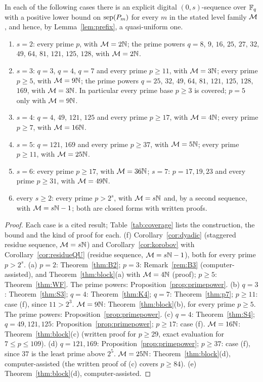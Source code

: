 \begin{theorem}[Coverage]\label{thm:coverage}
In each of the following cases there is an explicit digital $(0,s)$-sequence over $\mathbb{F}_q$ with a positive lower bound on $\operatorname{sep}(P_m)$ for every $m$ in the stated level family $\mathcal{M}$, and hence, by Lemma~\ref{lem:prefix}, a quasi-uniform one.
\begin{enumerate}
\item[(a)] $s=2$: every prime $p$, with $\mathcal{M}=2\mathbb{N}$; the prime powers $q=8$, $9$, $16$, $25$, $27$, $32$, $49$, $64$, $81$, $121$, $125$, $128$, with $\mathcal{M}=2\mathbb{N}$.
\item[(b)] $s=3$: $q=3$, $q=4$, $q=7$ and every prime $p\ge11$, with $\mathcal{M}=3\mathbb{N}$; every prime $p\ge5$, with $\mathcal{M}=9\mathbb{N}$; the prime powers $q=25$, $32$, $49$, $64$, $81$, $121$, $125$, $128$, $169$, with $\mathcal{M}=3\mathbb{N}$. In particular every prime base $p\ge3$ is covered; $p=5$ only with $\mathcal{M}=9\mathbb{N}$.
\item[(c)] $s=4$: $q=4$, $49$, $121$, $125$ and every prime $p\ge17$, with $\mathcal{M}=4\mathbb{N}$; every prime $p\ge7$, with $\mathcal{M}=16\mathbb{N}$.
\item[(d)] $s=5$: $q=121$, $169$ and every prime $p\ge37$, with $\mathcal{M}=5\mathbb{N}$; every prime $p\ge11$, with $\mathcal{M}=25\mathbb{N}$.
\item[(e)] $s=6$: every prime $p\ge17$, with $\mathcal{M}=36\mathbb{N}$; $s=7$: $p=17,19,23$ and every prime $p\ge31$, with $\mathcal{M}=49\mathbb{N}$.
\item[(f)] every $s\ge2$: every prime $p>2^s$, with $\mathcal{M}=s\mathbb{N}$ and, by a second sequence, with $\mathcal{M}=s\mathbb{N}-1$; both are closed forms with written proofs.
\end{enumerate}
\end{theorem}

\begin{proof}
Each case is a cited result; Table~\ref{tab:coverage} lists the construction, the bound and the kind of proof for each.
(f) Corollary~\ref{cor:dyadic} (staggered residue sequence, $\mathcal{M}=s\mathbb{N}$) and Corollary~\ref{cor:korobov} with Corollary~\ref{cor:residueQU} (residue sequence, $\mathcal{M}=s\mathbb{N}-1$), both for every prime $p>2^s$.
(a) $p=2$: Theorem~\ref{thm:B2}; $p=3$: Remark~\ref{rem:B3} (computer-assisted), and Theorem~\ref{thm:block}(a) with $\mathcal{M}=4\mathbb{N}$ (proof); $p\ge5$: Theorem~\ref{thm:WF}. The prime powers: Proposition~\ref{prop:primepower}.
(b) $q=3$: Theorem~\ref{thm:S3}; $q=4$: Theorem~\ref{thm:K4}; $q=7$: Theorem~\ref{thm:p7}; $p\ge11$: case (f), since $11>2^3$. $\mathcal{M}=9\mathbb{N}$: Theorem~\ref{thm:block}(b), for every prime $p\ge5$. The prime powers: Proposition~\ref{prop:primepower}.
(c) $q=4$: Theorem~\ref{thm:S4}; $q=49,121,125$: Proposition~\ref{prop:primepower}; $p\ge17$: case (f). $\mathcal{M}=16\mathbb{N}$: Theorem~\ref{thm:block}(c) (written proof for $p\ge29$, exact evaluation for $7\le p\le109$).
(d) $q=121,169$: Proposition~\ref{prop:primepower}; $p\ge37$: case (f), since $37$ is the least prime above $2^5$. $\mathcal{M}=25\mathbb{N}$: Theorem~\ref{thm:block}(d), computer-assisted (the written proof of (c) covers $p\ge84$).
(e) Theorem~\ref{thm:block}(d), computer-assisted.
\end{proof}

